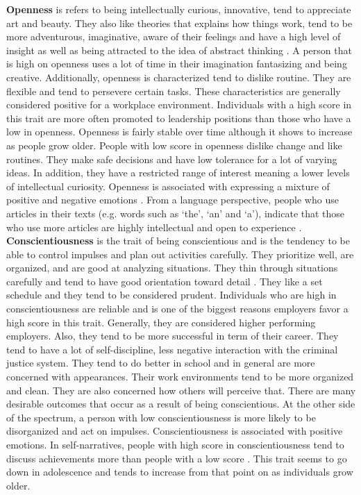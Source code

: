 \textbf{Openness} is refers to being intellectually curious, innovative, tend to appreciate art and beauty. They also like theories that explains how things work, tend to be more adventurous, imaginative, aware of their feelings and have a high level of insight as well as being attracted to the idea of abstract thinking \cite{big-five-john1999big}. A person that is high on openness uses a lot of time in their imagination fantasizing and being creative. Additionally,  openness is characterized tend to dislike routine. They are flexible and tend to persevere certain tasks. These characteristics are generally considered positive for a workplace environment. Individuals with a high score in this trait are more often promoted to leadership positions than those who have a low in openness. Openness is fairly stable over time although it shows to increase as people grow older. People with low score in openness dislike change and like routines. They make safe decisions and have low tolerance for a lot of varying ideas. In addition, they have a restricted range of interest meaning a lower levels of intellectual curiosity. Openness is associated with expressing a mixture of positive and negative emotions \cite{openness1-BARFORD2016118}. From a language perspective, people who use articles in their texts (e.g. words such as ‘the’, ‘an’ and ‘a’), indicate that those who use more articles are highly intellectual and open to experience \cite{openness2-fast2008personality}. \\

\textbf{Conscientiousness} is the trait of being conscientious and is the tendency to be able to control impulses and plan out activities carefully. They prioritize well, are organized, and are good at analyzing situations. They thin through situations carefully and tend to have good orientation toward detail \cite{big-five-john1999big}. They like a set schedule and they tend to be considered prudent. Individuals who are high in conscientiousness are reliable and is one of the biggest reasons employers favor a high score in this trait. Generally, they are considered higher performing employers. Also, they tend to be more successful in term of their career. They tend to have a lot of self-discipline, less negative interaction with the criminal justice system. They tend to do better in school and in general are more concerned with appearances. Their work environments tend to be more organized and clean. They are also concerned how others will perceive that. There are many desirable outcomes that occur as a result of being conscientious. At the other side of the spectrum, a person with low conscientiousness is more likely to be disorganized and act on impulses. Conscientiousness is associated with positive emotions. In self-narratives, people with high score in conscientiousness tend to discuss achievements more than people with a low score \cite{conscientiousness1-HIRSH2009524}. This trait seems to go down in adolescence and tends to increase from that point on as individuals grow older. \\


